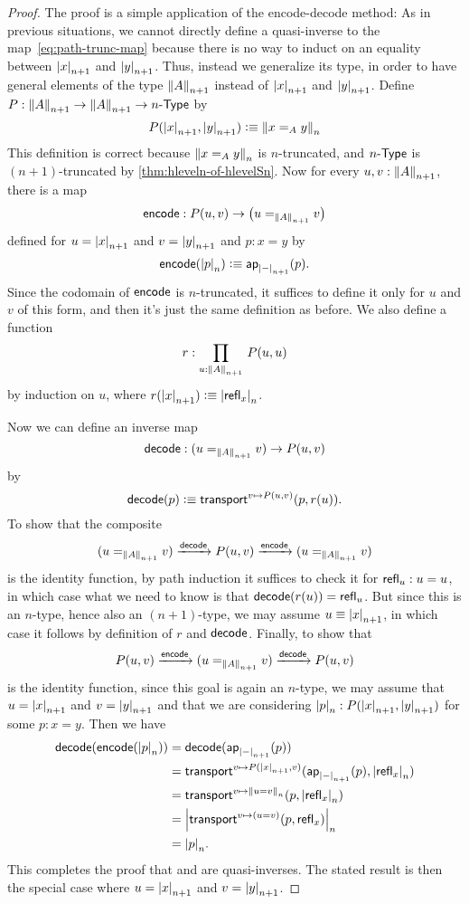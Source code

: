 \begin{proof}
  The proof is a simple application of the encode-decode method: 
  As in previous situations, we cannot directly define a quasi-inverse to the map~\eqref{eq:path-trunc-map} because there is no way to induct on an
equality between $\tproj {n+1}x$ and $\tproj {n+1}y$.
  Thus, instead we generalize its type, in order to have general elements of the type $\trunc{n+1}A$ instead of $\tproj {n+1}x$ and $\tproj
{n+1}y$.
  Define $P:\trunc {n+1}A\to\trunc {n+1}A\to\typele{n}$ by
  \[P(\tproj {n+1}x,\tproj {n+1}y)\defeq \trunc n{x=_Ay}\]
  This definition is correct because $\trunc n{x=_Ay}$ is $n$-truncated, and $\typele{n}$ is $(n+1)$-truncated by
\autoref{thm:hleveln-of-hlevelSn}.
  Now for every $u,v:\trunc{n+1}A$, there is a map
  \[\encode:P(u,v) \to \big(u=_{\trunc{n+1}A}v\big)\]
  defined for $u=\tproj {n+1}x$ and $v=\tproj {n+1}y$ and $p:x=y$ by
  \[\encode(\tproj n{p})\defeq \apfunc{\tproj{n+1}-} (p).\]
  Since the codomain of $\encode$ is $n$-truncated, it suffices to define it only for $u$ and $v$ of this form, and then it's just the same
definition as before.
  We also define a function
  \[ r : \prd{u:\trunc{n+1} A} P(u,u) \]
  by induction on $u$, where $r(\tproj{n+1} x) \defeq \tproj n {\refl x}$.

  Now we can define an inverse map
  \[\decode: (u=_{\trunc{n+1}A}v) \to P(u,v)\]
  by
  \[\decode(p) \defeq \transfib{v\mapsto P(u,v)}{p}{r(u)}. \]
  To show that the composite
  \[ (u=_{\trunc{n+1}A}v) \xrightarrow{\decode} P(u,v) \xrightarrow{\encode} (u=_{\trunc{n+1}A}v) \]
  is the identity function, by path induction it suffices to check it for $\refl u : u=u$, in which case what we need to know is that
$\decode(r(u)) = \refl{u}$.
  But since this is an $n$-type, hence also an $(n+1)$-type, we may assume $u\jdeq \tproj {n+1} x$, in which case it follows by definition
of $r$ and $\decode$.
  Finally, to show that 
  \[ P(u,v) \xrightarrow{\encode} (u=_{\trunc{n+1}A}v) \xrightarrow{\decode} P(u,v) \]
  is the identity function, since this goal is again an $n$-type, we may assume that $u=\tproj {n+1}x$ and $v=\tproj {n+1}y$ and that we are
considering $\tproj n p:P(\tproj{n+1}x,\tproj{n+1}y)$ for some $p:x=y$.
  Then we have
  \begin{align*}
    \decode(\encode(\tproj n p)) &= \decode(\apfunc{\tproj{n+1}-}(p))\\
    &= \transfib{v\mapsto P(\tproj{n+1}x,v)}{\apfunc{\tproj{n+1}-}(p)}{\tproj n {\refl x}}\\
    &= \transfib{v\mapsto \trunc n{u=v}}{p}{\tproj n {\refl x}}\\
    &= \tproj n {\transfib{v \mapsto (u=v)}{p}{\refl x}}\\
    &= \tproj n p.
  \end{align*}
  This completes the proof that \encode and \decode are quasi-inverses.
  The stated result is then the special case where $u=\tproj {n+1}x$ and $v=\tproj {n+1}y$.
\end{proof}

